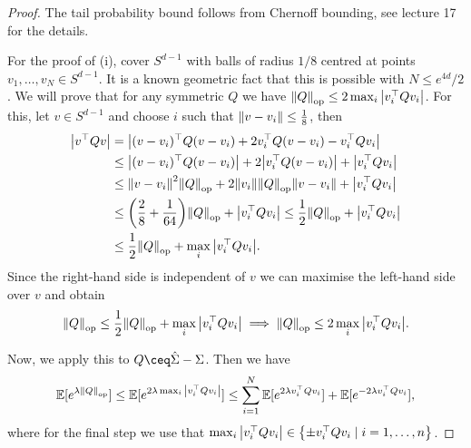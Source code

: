 \begin{proof}
	The tail probability bound follows from Chernoff bounding, see lecture 17 for the details. 
	
	For the proof of (i), cover $S^{d-1}$ with balls of radius $1/8$ centred at points $v_1, \dotsc, v_N \in S^{d-1}$. It is a known geometric fact that this is possible with $N \leq e^{4d}/2$.  We will prove that for any symmetric $Q$ we have $ \norm{Q}_\mathrm{op} \leq 2 \max_i \abs{v_i^\top Q v_i}$. For this, let $v \in S^{d-1}$ and choose $i$ such that $\norm{v - v_i} \leq \frac18$, then
	\begin{align*}
	\abs{v^\top Qv} &= \abs{(v - v_i)^\top Q (v - v_i) + 2 v_i^\top Q(v - v_i) - v_i^\top Q v_i} \\
	&\leq \abs{(v - v_i)^\top Q(v - v_i)} + 2 \abs{v_i^\top Q(v - v_i)} + \abs{v_i^\top Q v_i} \\
	&\leq \norm{v - v_i}^2 \norm{Q}_\mathrm{op} + 2 \norm{v_i} \norm{Q}_\mathrm{op} \norm{v - v_i} + \abs{v_i^\top Q v_i} \\
	&\leq \qty(\frac28 + \frac1{64}) \norm{Q}_\mathrm{op} + \abs{v_i^\top Q v_i} \leq \frac12 \norm{Q}_\mathrm{op} + \abs{v_i^\top Q v_i} \\
	&\leq \frac12\norm{Q}_\mathrm{op} + \max_i \abs{v_i^\top Q v_i}. 
	\end{align*}
	Since the right-hand side is independent of $v$ we can maximise the left-hand side over $v$ and obtain 
	\[
	\norm{Q}_\mathrm{op} \leq \frac12\norm{Q}_\mathrm{op} + \max_i \abs{v_i^\top Q v_i} \implies \norm{Q}_\mathrm{op} \leq 2 \max_i \abs{v_i^\top Q v_i}. 
	\]
	
	Now, we apply this to $Q \ceq \hat\Sigma - \Sigma$. Then we have
	\begin{equation} \label{eq:crude_moment_bound}
		\mathbb E[e^{\lambda \norm{Q}_\mathrm{op}}] \leq \mathbb E[e^{2\lambda \max_i \abs{v_i^\top Qv_i}}] \leq \sum_{i=1}^N \mathbb E[e^{2\lambda v_i^\top Q v_i}] + \mathbb E[ e^{-2\lambda v_i^\top Q v_i}], 
		\end{equation}
	where for the final step we use that $\max_i \abs{v_i^\top Q v_i} \in \qty{\pm v_i^\top Q v_i \mid i = 1, \dotsc, n}$. 
	

\end{proof}
